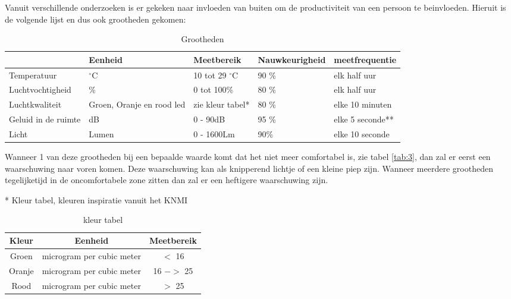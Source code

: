 Vanuit verschillende onderzoeken is er gekeken naar invloeden van buiten om de productiviteit van een persoon te beinvloeden. \cite{productiviteit} 
Hieruit is de volgende lijst en dus ook grootheden gekomen:

\begin{table}[ht]
    \begin{tabular}{p{3.3cm}||p{3cm}|p{3cm}|p{3cm}|p{3cm}}
         & Eenheid & Meetbereik & Nauwkeurigheid & meetfrequentie\\
         \hline
        Temperatuur &  $^{\circ}$C  & 10 tot 29 $^{\circ}$C & 90 \% & elk half uur\\
        Luchtvochtigheid & \% & 0 tot 100\%& 80 \% & elk half uur\\
        Luchtkwaliteit & Groen, Oranje en rood led & zie kleur tabel*& 80 \% & elke 10 minuten\\
        Geluid in de ruimte & dB & 0 - 90dB & 95 \% & elke 5 seconde**\\
        Licht & Lumen & 0 - 1600Lm & 90\% & elke 10 seconde
    \end{tabular}
    \caption{Grootheden}
    \label{tab:1}
\end{table}


 \vspace{1cm}
Wanneer 1 van deze grootheden bij een bepaalde waarde komt dat het niet meer comfortabel is, zie tabel \ref{tab:3}, dan zal er eerst een waarschuwing naar voren komen. Deze waarschuwing kan als knipperend lichtje of een kleine piep zijn. Wanneer meerdere grootheden tegelijketijd in de oncomfortabele zone zitten dan zal er een heftigere waarschuwing zijn. 

\vspace{1.5cm}
* Kleur tabel, kleuren inspiratie vanuit het KNMI \cite{Gezonde} \\

\begin{table}[ht]
    \begin{tabular}{c|c|c}
       Kleur & Eenheid & Meetbereik \\
       \hline
       Groen  &  microgram per cubic meter & $ < $ 16\\
       Oranje  &  microgram per cubic meter & 16 $->$ 25\\
       Rood & microgram per cubic meter & $>$ 25
    \end{tabular}
    \caption{kleur tabel}
    \label{tab:2}
\end{table}

\vspace{0.2cm}

